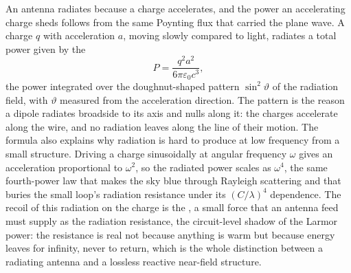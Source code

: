 \begin{mastery}
An antenna radiates because a charge accelerates, and the power an
accelerating charge sheds follows from the same Poynting flux that carried
the plane wave. A charge $q$ with acceleration $a$, moving slowly compared
to light, radiates a total power given by the 
\[
P = \frac{q^{2} a^{2}}{6\pi\varepsilon_0 c^{3}},
\]
the power integrated over the doughnut-shaped pattern $\sin^2\vartheta$ of
the radiation field, with $\vartheta$ measured from the acceleration
direction. The pattern is the reason a dipole radiates broadside to its
axis and nulls along it: the charges accelerate along the wire, and no
radiation leaves along the line of their motion. The formula also explains
why radiation is hard to produce at low frequency from a small structure.
Driving a charge sinusoidally at angular frequency $\omega$ gives an
acceleration proportional to $\omega^2$, so the radiated power scales as
$\omega^4$, the same fourth-power law that makes the sky blue through
Rayleigh scattering and that buries the small loop's radiation resistance
under its $(C/\lambda)^4$ dependence. The recoil of this radiation on the
charge is the , a small force that an antenna
feed must supply as the radiation resistance, the circuit-level shadow of
the Larmor power: the resistance is real not because anything is warm but
because energy leaves for infinity, never to return, which is the whole
distinction between a radiating antenna and a lossless reactive
near-field structure.
\end{mastery}

